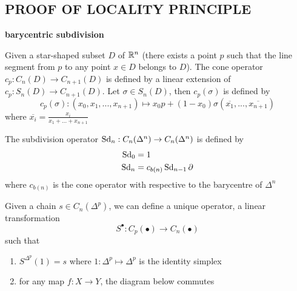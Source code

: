 \documentclass{report}
\begin{document}
\subsection{PROOF OF LOCALITY PRINCIPLE}
\textbf{barycentric subdivision}

\begin{definition}
    Given a star-shaped subset $D$ of $\mathbb{R}^n$ (there exists a point $p$ such that the line segment from $p$ to any point $x \in D$ belongs to $D$). The cone operator $c_p: C_n(D) \to C_{n+1}(D)$ is defined by a linear extension of $c_p: S_n(D) \to C_{n+1}(D)$. Let $\sigma \in S_n(D)$, then $c_p(\sigma)$ is defined by
    $$
        c_p(\sigma): (x_0, x_1, ..., x_{n+1}) \mapsto x_0 p + (1-x_0) \sigma(\overline{x_1}, ..., \overline{x_{n+1}})
    $$
    where $\overline{x_i} = \frac{x_i}{x_1 + ... + x_{n+1}}$    
\end{definition}

\begin{definition}
    The subdivision operator $\operatorname{Sd}_n: C_n(\Delta^n) \to C_n(\Delta^n)$ is defined by
    \begin{align*}
        \operatorname{Sd}_0 &= 1 \\
        \operatorname{Sd}_n &= c_{b(n)} \operatorname{Sd}_{n-1} \partial
    \end{align*}
    where $c_{b(n)}$ is the cone operator with respective to the barycentre of $\Delta^n$
\end{definition}

\begin{lemma}
    \label{lemma_3}
    Given a chain $s \in C_n(\Delta^p)$, we can define a unique operator, a linear transformation
    $$
        S^\bullet: C_p(\bullet) \to C_n(\bullet)
    $$
    such that
    \begin{enumerate}
        \item $S^{\Delta^p}(1) = s$ where $1: \Delta^p \mapsto \Delta^p$ is the identity simplex
        \item for any map $f: X \to Y$, the diagram below commutes
        \begin{center}
        \end{center}
\end{enumerate}
\end{lemma}
\end{document}
